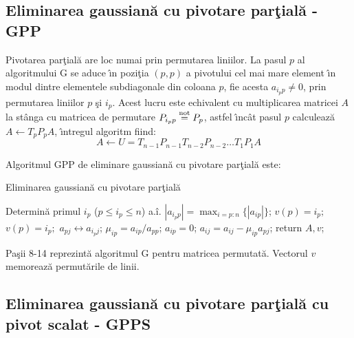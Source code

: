 \documentclass{exam}
\begin{document}
\subsection{Eliminarea gaussian\u{a} cu pivotare parţială - GPP}

\par Pivotarea par\c{t}ial\u{a} are loc numai prin permutarea liniilor. La pasul $p$ al algoritmului G se aduce \^{\i}n pozi\c{t}ia $(p,p)$ a pivotului cel mai mare element \^{\i}n modul dintre elementele subdiagonale din coloana $p$, fie acesta $a_{i_p p}\ne 0$, prin permutarea liniilor $p$ \c{s}i $i_p$. Acest lucru este echivalent cu multiplicarea matricei $A$ la st\^{a}nga cu matricea de permutare $P_{i_p p}\stackrel{\rm not}{=}P_p$, astfel \^{\i}nc\^at pasul $p$ calculeaz\u{a} $A \leftarrow T_p P_p A$, \^{\i}ntregul algoritm fiind:
$$
	A \leftarrow U = T_{n-1} P_{n-1} T_{n-2} P_{n-2} \ldots T_1 P_1 A
$$

Algoritmul GPP de eliminare gaussian\u{a} cu pivotare par\c{t}ial\u{a} este:

\begin{algorithm} [H]
	\caption{Eliminarea gaussian\u{a} cu pivotare par\c{t}ial\u{a}}
	\label{gpp}
	\begin{algorithmic}[1]
		\State Determin\u{a} primul $i_p$ ($p \leq i_p \leq n$) a.î. $|a_{i_p p}|=\max_{i=p:n}{\{|a_{ip}|\}}$; $v(p) = i_p;$
		\State $v(p) = i_p;$
		\State $a_{pj} \leftrightarrow a_{i_p j}$;
		\EndFor
		\State $\mu_{ip} = a_{ip}/a_{pp}$;
		\State $a_{ip} = 0$;
		\State $a_{ij} = a_{ij} - \mu_{ip} a_{pj}$;
		\EndFor
		\EndFor
		\EndFor
		\State return $A,v$;
		\EndProcedure
	\end{algorithmic}
\end{algorithm}

Pa\c{s}ii 8-14 reprezint\u{a} algoritmul G pentru matricea permutat\u{a}. Vectorul $v$ memoreaz\u{a} permut\u{a}rile de linii.

\subsection{Eliminarea gaussian\u{a} cu pivotare parţială cu pivot scalat - GPPS}
\end{document}
